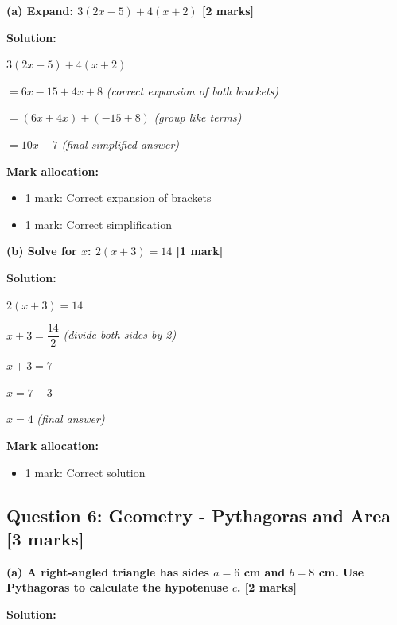 \documentclass[12pt,a4paper]{article}
\begin{document}
\textbf{(a) Expand: $3(2x - 5) + 4(x + 2)$ \hfill [2 marks]}

\vspace{0.2cm}
\noindent\textbf{Solution:}

$3(2x - 5) + 4(x + 2)$

$= 6x - 15 + 4x + 8$ \checkmark\checkmark \quad \textit{(correct expansion of both brackets)}

$= (6x + 4x) + (-15 + 8)$ \quad \textit{(group like terms)}

$= 10x - 7$ \checkmark \quad \textit{(final simplified answer)}

\vspace{0.3cm}
\noindent\textbf{Mark allocation:}
\begin{itemize}
    \item 1 mark: Correct expansion of brackets
    \item 1 mark: Correct simplification
\end{itemize}

\vspace{0.4cm}

\textbf{(b) Solve for $x$: $2(x + 3) = 14$ \hfill [1 mark]}

\vspace{0.2cm}
\noindent\textbf{Solution:}

$2(x + 3) = 14$

$x + 3 = \dfrac{14}{2}$ \checkmark \quad \textit{(divide both sides by 2)}

$x + 3 = 7$

$x = 7 - 3$

$x = 4$ \checkmark \quad \textit{(final answer)}

\vspace{0.3cm}
\noindent\textbf{Mark allocation:}
\begin{itemize}
    \item 1 mark: Correct solution
\end{itemize}

\subsection*{Question 6: Geometry - Pythagoras and Area [3 marks]}

\textbf{(a) A right-angled triangle has sides $a = 6$ cm and $b = 8$ cm. Use Pythagoras to calculate the hypotenuse $c$. \hfill [2 marks]}

\vspace{0.2cm}
\noindent\textbf{Solution:}
\end{document}
